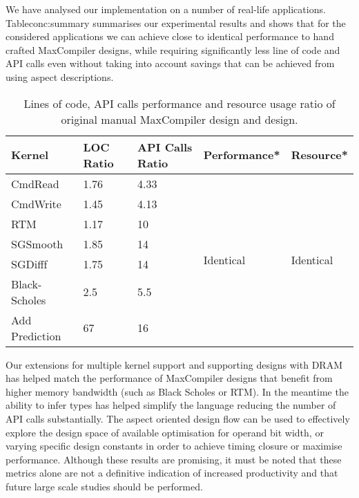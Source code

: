 We have analysed our implementation on a number of real-life
applications. Table{conc:summary} summarises our experimental results
and shows that for the considered applications we can achieve close to
identical performance to hand crafted MaxCompiler designs, while
requiring significantly less line of code and API calls even without
taking into account savings that can be achieved from using aspect
descriptions.

\begin{table}[ht!]
\begin{tabularx}{\textwidth}{X|X|X|X|X}
\textbf{Kernel} & \textbf{LOC Ratio} & \textbf{API Calls Ratio} & \textbf{Performance*}        & \textbf{Resource*}
          \\
\hline\hline
CmdRead         & 1.76                              & 4.33                                     & \multirow{7}{*}{Identical} & \multirow{7}{*}{Identical} \\
CmdWrite        & 1.45                              & 4.13                                     &                            &                            \\
RTM             & 1.17                              & 10                                       &                            &                            \\
SGSmooth        & 1.85                              & 14                                       &                            &                            \\
SGDifff         & 1.75                              & 14                                       &                            &                            \\
Black-Scholes   & 2.5                               & 5.5                                      &                            &                            \\
Add Prediction  & 67                                & 16                                       &                            &                            \\
\end{tabularx}
\caption{Lines of code, API calls performance and resource usage ratio of original manual MaxCompiler design and \FAST{} design.}
\label{conc:summary}
\end{table}


Our extensions for multiple kernel support and supporting designs with
DRAM has helped match the performance of MaxCompiler designs that
benefit from higher memory bandwidth (such as Black Scholes or
RTM). In the meantime the ability to infer types has helped simplify
the language reducing the number of API calls substantially. The
aspect oriented design flow can be used to effectively explore the
design space of available optimisation for operand bit width, or
varying specific design constants in order to achieve timing closure
or maximise performance. Although these results are promising, it must
be noted that these metrics alone are not a definitive indication of
increased productivity and that future large scale studies should be
performed.

